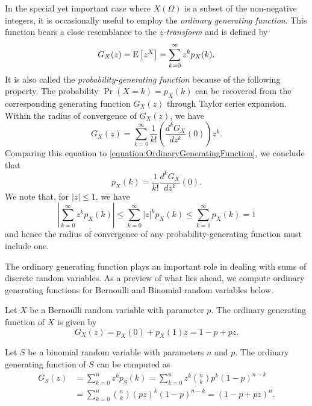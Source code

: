 In the special yet important case where $X(\Omega)$ is a subset of the non-negative integers, it is occasionally useful to employ the \emph{ordinary generating function}. 
This function bears a close resemblance to the \emph{$z$-transform} and is defined by 
\begin{equation} \label{equation:OrdinaryGeneratingFunction}
G_X(z) = \mathrm{E} \left[ z^X \right] = \sum_{k=0}^{\infty} z^k p_X (k) .
\end{equation}
It is also called the \emph{probability-generating function} because of the following property. 
The probability $\Pr (X = k) = p_X(k)$ can be recovered from the corresponding generating function $G_X (z)$ through Taylor series expansion.
Within the radius of convergence of $G_X(z)$, we have
\begin{equation*}
G_X(z) = \sum_{k=0}^{\infty} \frac{1}{k!} \left( \frac{d^k G_X}{dz^k}(0) \right) z^k .
\end{equation*}
Comparing this equation to \eqref{equation:OrdinaryGeneratingFunction}, we conclude that
\begin{equation*}
p_X(k) = \frac{1}{k!} \frac{d^k G_X}{dz^k} (0) .
\end{equation*}
We note that, for $|z| \leq 1$, we have
\begin{equation*}
\left| \sum_{k=0}^{\infty} z^k p_X(k) \right|
\leq \sum_{k=0}^{\infty} |z|^k p_X(k)
\leq \sum_{k=0}^{\infty} p_X(k) = 1
\end{equation*}
and hence the radius of convergence of any probability-generating function must include one.

The ordinary generating function plays an important role in dealing with sums of discrete random variables.
As a preview of what lies ahead, we compute ordinary generating functions for Bernoulli and Binomial random variables below.

\begin{example}
Let $X$ be a Bernoulli random variable with parameter $p$.
The ordinary generating function of $X$ is given by
\begin{equation*}
G_X(z) = p_X(0) + p_X(1) z
= 1 - p + pz .
\end{equation*}
\end{example}

\begin{example}
Let $S$ be a binomial random variable with parameters $n$ and $p$.
The ordinary generating function of $S$ can be computed as
\begin{equation*}
\begin{split}
G_S(z) &= \sum_{k=0}^{n} z^k p_S (k)
= \sum_{k=0}^{n} z^k \binom{n}{k} p^k (1 - p)^{n-k} \\
&= \sum_{k=0}^{n} \binom{n}{k} (pz)^k (1 - p)^{n-k}
= (1 - p + pz)^n .
\end{split}
\end{equation*}
\end{example}

